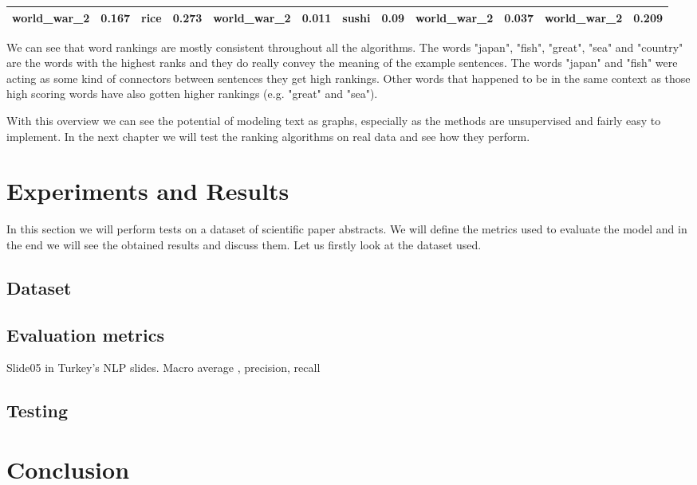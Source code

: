 \documentclass[12pt]{article}
\numberwithin{equation}{section}
\begin{document}
\begin{spacing}{1.5}
\begin{table}[H]
{\begin{tabular}{|cc|cc|cc|cc|cc|cc|}
			\multicolumn{1}{|c|}{world\_war\_2} & 0.167   & \multicolumn{1}{c|}{rice}          & 0.273   & \multicolumn{1}{c|}{world\_war\_2} & 0.011   & \multicolumn{1}{c|}{sushi}         & 0.09    & \multicolumn{1}{c|}{world\_war\_2} & 0.037   & \multicolumn{1}{c|}{world\_war\_2} & 0.209   \\ \hline
		\end{tabular}
	}
	\end{table}
	We can see that word rankings are mostly consistent throughout all the algorithms. The words "japan", "fish", "great", "sea" and "country" are the words with the highest ranks and they do really convey the meaning of the example sentences. The words "japan" and "fish" were acting as some kind of connectors between sentences they get high rankings. Other words that happened to be in the same context as those high scoring words have also gotten higher rankings (e.g. "great" and "sea"). 
	
	With this overview we can see the potential of modeling text as graphs, especially as the methods are unsupervised and fairly easy to implement. In the next chapter we will test the ranking algorithms on real data and see how they perform.
	
	\newpage
	\section{Experiments and Results}
	In this section we will perform tests on a dataset of scientific paper abstracts. We will define the metrics used to evaluate the model and in the end we will see the obtained results and discuss them. Let us firstly look at the dataset used.
	
	\subsection{Dataset}
	
	\subsection{Evaluation metrics}
	Slide05 in Turkey's NLP slides.
	Macro average , precision, recall
	\subsection{Testing}
	
	\newpage
	\section{Conclusion}
	

\end{spacing}
\end{document}
